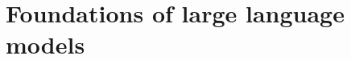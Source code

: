 \documentclass[11pt,a4paper,oneside,openany]{book}
\begin{document}
\frontmatter

\tableofcontents



\mainmatter

\part{Foundations of large language models}






% 
% 
% 
% 
% 
% 
% 
% 
% 
% 
% 
% 
% 


\backmatter


\end{document}
